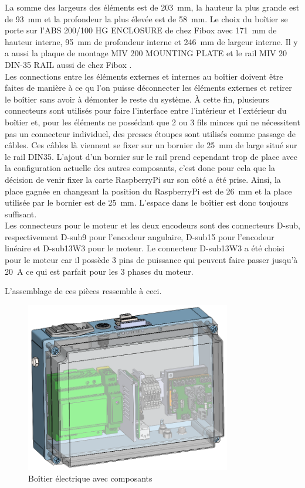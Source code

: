 La somme des largeurs des éléments est de 203~mm, la hauteur la plus grande est de 93~mm et la profondeur la plus élevée est de 58~mm. Le choix
du boîtier se porte sur l'ABS 200/100 HG ENCLOSURE de chez Fibox \cite{Fibox} avec 171~mm de hauteur interne, 95~mm de profondeur interne et
246~mm de largeur interne. Il y a aussi la plaque de montage MIV 200 MOUNTING PLATE et le rail MIV 20 DIN-35 RAIL aussi de chez Fibox \cite{Fibox}.\\

Les connections entre les éléments externes et internes au boîtier doivent être faites de manière à ce qu l'on puisse déconnecter les éléments
externes et retirer le boîtier sans avoir à démonter le reste du système. À cette fin, plusieurs connecteurs sont utilisés pour faire l'interface
entre l'intérieur et l'extérieur du boîtier et, pour les éléments ne possédant que 2 ou 3 fils minces qui ne nécessitent pas un connecteur
individuel, des presses étoupes sont utilisés comme passage de câbles. Ces câbles là viennent se fixer sur un bornier de 25~mm de large situé
sur le rail DIN35. L'ajout d'un bornier sur le rail prend cependant trop de place avec la configuration actuelle des autres composants, c'est
donc pour cela que la décision de venir fixer la carte RaspberryPi sur son côté a été prise. Ainsi, la place gagnée en changeant la position du
RaspberryPi est de 26~mm et la place utilisée par le bornier est de 25~mm. L'espace dans le boîtier est donc toujours suffisant.\\

Les connecteurs pour le moteur et les deux encodeurs sont des connecteurs D-sub, respectivement D-sub9 pour l'encodeur angulaire, D-sub15 pour
l'encodeur linéaire et D-sub13W3 pour le moteur. Le connecteur D-sub13W3 a été choisi pour le moteur car il possède 3 pins de puissance qui
peuvent faire passer jusqu'à 20~A ce qui est parfait pour les 3 phases du moteur.

L'assemblage de ces pièces ressemble à ceci.

\begin{figure}[H]
  \centering
  \includegraphics[width = 0.8\textwidth]{assets/figures/AssemblageBoitierElectrique.png}
  \caption{Boîtier électrique avec composants}
  \label{fig:AssBoitierElec}
\end{figure}

